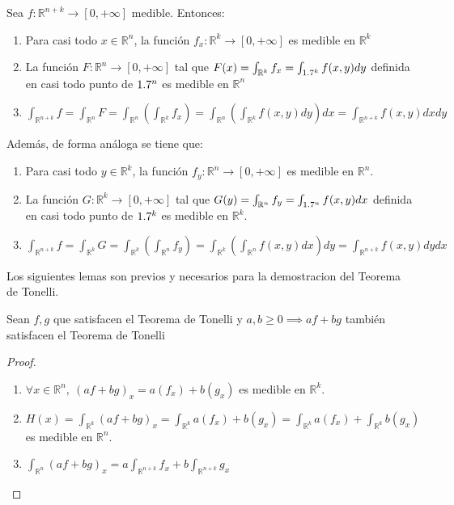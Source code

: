 \begin{teorema}
    Sea $f : \mathbb{R}^{n+k} \to [0, +\infty]$ medible. Entonces:
    \vspace{-0.5em}
    \begin{enumerate}
        \item Para casi todo $x \in \mathbb{R}^n$, la función $f_{x} : \mathbb{R}^k \to [0,
                      +\infty]$ es medible en $\mathbb{R}^k$
        \item La función $F: \mathbb{R}^n \to [0, +\infty]$ tal que $F(x) =
                  \int_{\mathbb{R}^k}f_x = \int_{1.7^k} f(x,y)dy$ definida en casi todo punto de
              $1.7^n$ es medible en $\mathbb{R}^n$
        \item $\int_{\mathbb{R}^{n+k}}f = \int_{\mathbb{R}^n}F = \int_{\mathbb{R}^n}(\int_{\mathbb{R}^k}f_x) = \int_{\mathbb{R}^n}(\int_{\mathbb{R}^k}f(x,y)dy)dx = \int_{\mathbb{R}^{n+k}}f(x,y)dxdy$
    \end{enumerate}
    Además, de forma análoga se tiene que:
    \vspace{-0.5em}
    \begin{enumerate}
        \item Para casi todo $y \in \mathbb{R}^k$, la función $f_{y} : \mathbb{R}^n \to [0,
                      +\infty]$ es medible en $\mathbb{R}^n$.
        \item La función $G: \mathbb{R}^k \to [0, +\infty]$ tal que $G(y) =
                  \int_{\mathbb{R}^n}f_y = \int_{1.7^n} f(x,y)dx$ definida en casi todo punto de
              $1.7^k$ es medible en $\mathbb{R}^k$.
        \item $\int_{\mathbb{R}^{n+k}}f = \int_{\mathbb{R}^k}G = \int_{\mathbb{R}^k}(\int_{\mathbb{R}^n}f_y) = \int_{\mathbb{R}^k}(\int_{\mathbb{R}^n}f(x,y)dx)dy = \int_{\mathbb{R}^{n+k}}f(x,y)dydx$
    \end{enumerate}
\end{teorema}

\begin{observación}
Los siguientes lemas son previos y necesarios para la demostracion del Teorema de Tonelli.
\end{observación}

\begin{lema}
    Sean $f,g$ que satisfacen el Teorema de Tonelli y $a, b \geq 0 \implies af + bg$ también satisfacen el Teorema de Tonelli\label{lema1Tonelli}
\end{lema}

\begin{proof}
    \leavevmode
    \begin{enumerate}
        \item $\forall x \in \mathbb{R}^n, \ (af + bg)_x = a(f_x) + b(g_x)$ es medible en $\mathbb{R}^k$.
        \item $H(x) = \int_{\mathbb{R}^k}(af + bg)_x = \int_{\mathbb{R}^k}a(f_x) + b(g_x) = \int_{\mathbb{R}^k}a(f_x) + \int_{\mathbb{R}^k}b(g_x)$ es medible en $\mathbb{R}^n$.
        \item $\int_{\mathbb{R}^{n}}(af +bg)_x = a\int_{\mathbb{R}^{n+k}}f_x + b \int_{\mathbb{R}^{n+k}}g_x$
    \end{enumerate}
\end{proof}

